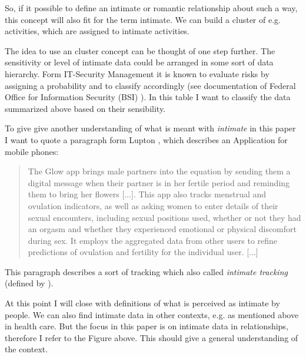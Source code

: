 So, if it possible to define an intimate or romantic relationship about such a way, this concept will also fit for the term intimate. We can build a cluster of e.g. activities, which are assigned to intimate activities.

The idea to use an cluster concept can be thought of one step further. The sensitivity or level of intimate data could be arranged in some sort of data hierarchy. Form IT-Security Management it is known to evaluate risks by assigning a probability and to classify accordingly (see documentation of Federal Office for Information Security (BSI) \cite{bsi}). In this table I want to classify the data summarized above based on their sensibility.

To give give another understanding of what is meant with \textit{intimate} in this paper I want to quote a paragraph form Lupton \cite{doi:10.1080/13691058.2014.920528}, which describes an Application for mobile phones:
\begin{quote}
	The	Glow app brings male partners into the equation by sending them a digital
	message when their partner is in her fertile period and reminding them to bring her flowers	[...]. This app also tracks menstrual and ovulation indicators, as well as asking women to enter details of their sexual encounters, including sexual positions used, whether or not they had an orgasm and whether they experienced emotional or physical discomfort during sex. It employs the aggregated data from other users to refine predictions of ovulation and fertility for the individual user. [...]
\end{quote}
This paragraph describes a sort of tracking which also called \textit{intimate tracking} (defined by \cite{doi:10.1080/15265161.2017.1409823}).

At this point  I will close with definitions of what is perceived as intimate by people. We can also find intimate data in other contexts, e.g. as mentioned above in health care. But the focus in this paper is on intimate data in relationships, therefore I refer to the Figure above. This should give a general understanding of the context. 
